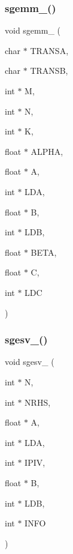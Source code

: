 \mbox{\label{a00476_aa675ecc26ad727070c2d31af7e0ff8b0}} 
\subsubsection{\texorpdfstring{sgemm\+\_\+()}{sgemm\_()}}
{\footnotesize\ttfamily void sgemm\+\_\+ (\begin{DoxyParamCaption}\item[{char $\ast$}]{T\+R\+A\+N\+SA,  }\item[{char $\ast$}]{T\+R\+A\+N\+SB,  }\item[{int $\ast$}]{M,  }\item[{int $\ast$}]{N,  }\item[{int $\ast$}]{K,  }\item[{float $\ast$}]{A\+L\+P\+HA,  }\item[{float $\ast$}]{A,  }\item[{int $\ast$}]{L\+DA,  }\item[{float $\ast$}]{B,  }\item[{int $\ast$}]{L\+DB,  }\item[{float $\ast$}]{B\+E\+TA,  }\item[{float $\ast$}]{C,  }\item[{int $\ast$}]{L\+DC }\end{DoxyParamCaption})}

\mbox{\label{a00476_a593a1c5071f01991707a6e4dacb8e3a7}} 
\subsubsection{\texorpdfstring{sgesv\+\_\+()}{sgesv\_()}}
{\footnotesize\ttfamily void sgesv\+\_\+ (\begin{DoxyParamCaption}\item[{int $\ast$}]{N,  }\item[{int $\ast$}]{N\+R\+HS,  }\item[{float $\ast$}]{A,  }\item[{int $\ast$}]{L\+DA,  }\item[{int $\ast$}]{I\+P\+IV,  }\item[{float $\ast$}]{B,  }\item[{int $\ast$}]{L\+DB,  }\item[{int $\ast$}]{I\+N\+FO }\end{DoxyParamCaption})}

